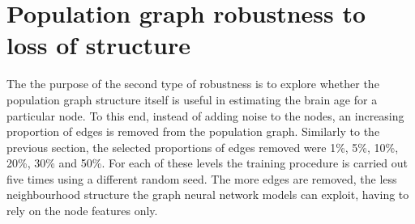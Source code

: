 \section{Population graph robustness to loss of structure}
The the purpose of the second type of robustness is to explore whether the population graph structure itself is useful in estimating the brain age for a particular node. To this end, instead of adding noise to the nodes, an increasing proportion of edges is removed from the population graph. Similarly to the previous section, the selected proportions of edges removed were 1\%, 5\%, 10\%, 20\%, 30\% and 50\%. For each of these levels the training procedure is carried out five times using a different random seed. The more edges are removed, the less neighbourhood structure the graph neural network models can exploit, having to rely on the node features only. 







